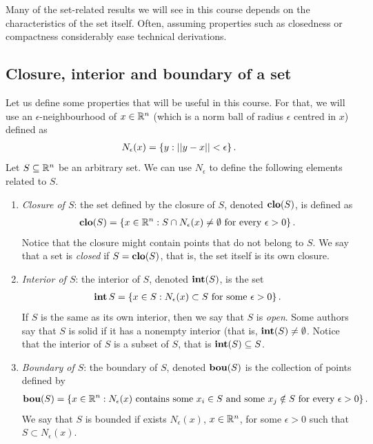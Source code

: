 Many of the set-related results we will see in this course depends on the characteristics of the set itself. Often, assuming properties such as closedness or compactness considerably ease technical derivations. 


\subsection{Closure, interior and boundary of a set}


Let us define some properties that will be useful in this course. For that, we will use an $\epsilon$-neighbourhood of $x \in \mathbb{R}^n$ (which is a norm ball of radius $\epsilon$ centred in $x$) defined as
%
\begin{align*}
    N_\epsilon(x) = \left\{ y : ||y - x|| < \epsilon \right \}.
\end{align*}
%
Let $S \subseteq \mathbb{R}^n$ be an arbitrary set. We can use $N_\epsilon$ to define the following elements related to $S$.  
\begin{enumerate}
\item \emph{Closure of $S$}: the set defined by the closure of $S$, denoted $\mathop{\bf clo}(S)$, is defined as 
%
\begin{align*}
\mathop{\bf clo}(S) = \left\{ x \in \mathbb{R}^n : S \cap N_\epsilon(x) \neq \emptyset \text{ for every } \epsilon > 0 \right \}. 
\end{align*}
%
Notice that the closure might contain points that do not belong to $S$. We say that a set is \emph{closed} if $S = \mathop{\bf clo}(S)$, that is, the set itself is its own closure. 
%
\item \emph{Interior of $S$}: the interior of $S$, denoted $\mathop{\bf int}(S)$, is the set
\begin{align*}
\mathop{\bf int}{S} = \left\{ x \in S : N_\epsilon(x) \subset S \text{ for some } \epsilon > 0 \right \}.
\end{align*}
%
If $S$ is the same as its own interior, then we say that $S$ is \emph{open}. Some authors say that $S$ is solid if it has a nonempty interior (that is, $\mathop{\bf int}(S) \neq \emptyset$. Notice that the interior of $S$ is a subset of $S$, that is $\mathop{\bf int}(S) \subseteq S$.
%
\item \emph{Boundary of $S$}: the boundary of $S$, denoted $\mathop{\bf bou}(S)$ is the collection of points defined by
%
\begin{align*}
\mathop{\bf bou}(S) = \left\{ x \in \mathbb{R}^n : N_\epsilon(x) \text{ contains some } x_i \in S \text{ and some } x_j \notin S \text{ for every } \epsilon > 0 \right \}.
\end{align*}
%
We say that $S$ is bounded if exists $N_\epsilon(x)$, $x \in \mathbb{R}^n$, for some $\epsilon > 0$ such that $S \subset N_\epsilon(x)$. 
\end{enumerate}


